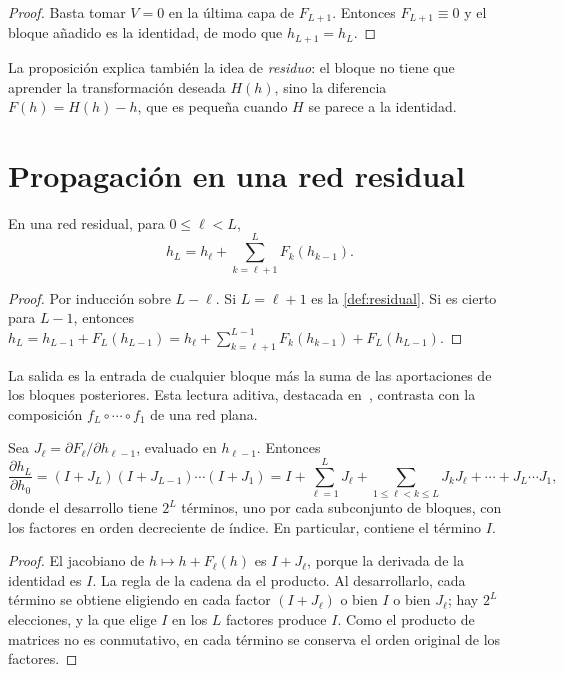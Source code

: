 \begin{proof}
Basta tomar $V=0$ en la última capa de $F_{L+1}$. Entonces $F_{L+1}\equiv 0$ y el bloque añadido es la identidad, de modo que $h_{L+1}=h_L$.
\end{proof}

La proposición explica también la idea de \emph{residuo}: el bloque no tiene que aprender la transformación deseada $H(h)$, sino la diferencia $F(h)=H(h)-h$, que es pequeña cuando $H$ se parece a la identidad.

\section{Propagación en una red residual}

\begin{proposicion}\label{prop:adelante}
En una red residual, para $0\le\ell<L$,
\[
h_L=h_\ell+\sum_{k=\ell+1}^{L}F_k(h_{k-1}).
\]
\end{proposicion}

\begin{proof}
Por inducción sobre $L-\ell$. Si $L=\ell+1$ es la \cref{def:residual}. Si es cierto para $L-1$, entonces $h_L=h_{L-1}+F_L(h_{L-1})=h_\ell+\sum_{k=\ell+1}^{L-1}F_k(h_{k-1})+F_L(h_{L-1})$.
\end{proof}

La salida es la entrada de cualquier bloque más la suma de las aportaciones de los bloques posteriores. Esta lectura aditiva, destacada en~\cite[§2]{resnet-id}, contrasta con la composición $f_L\circ\cdots\circ f_1$ de una red plana.

\begin{teorema}\label{teo:jac-residual}
Sea $J_\ell=\partial F_\ell/\partial h_{\ell-1}$, evaluado en $h_{\ell-1}$. Entonces
\[
\frac{\partial h_L}{\partial h_0}=(I+J_L)(I+J_{L-1})\cdots(I+J_1)
=I+\sum_{\ell=1}^{L}J_\ell+\sum_{1\le\ell<k\le L}J_kJ_\ell+\cdots+J_L\cdots J_1,
\]
donde el desarrollo tiene $2^{L}$ términos, uno por cada subconjunto de bloques, con los factores en orden decreciente de índice. En particular, contiene el término $I$.
\end{teorema}

\begin{proof}
El jacobiano de $h\mapsto h+F_\ell(h)$ es $I+J_\ell$, porque la derivada de la identidad es $I$. La regla de la cadena da el producto. Al desarrollarlo, cada término se obtiene eligiendo en cada factor $(I+J_\ell)$ o bien $I$ o bien $J_\ell$; hay $2^{L}$ elecciones, y la que elige $I$ en los $L$ factores produce $I$. Como el producto de matrices no es conmutativo, en cada término se conserva el orden original de los factores.
\end{proof}

